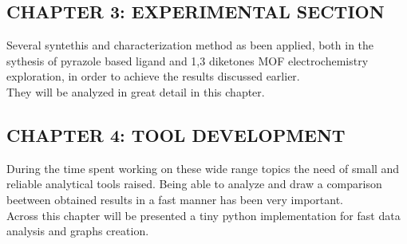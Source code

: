 \documentclass[a4,11pt]{report}
\begin{document}
\newline\subsection*{CHAPTER 3: EXPERIMENTAL SECTION}

Several syntethis and characterization method as been applied, both in the sythesis of pyrazole based ligand and 1,3 diketones MOF electrochemistry exploration, in order to achieve the results discussed earlier. \\
They will be analyzed in great detail in this chapter.

\newline\subsection*{CHAPTER 4: TOOL DEVELOPMENT}

During the time spent working on these wide range topics the need of small and reliable analytical tools raised. Being able to analyze and draw a comparison beetween obtained results in a fast manner has been very important. \\
Across this chapter will be presented a tiny python implementation for fast data analysis and graphs creation.

\newpage
\tableofcontents






\end{document}

